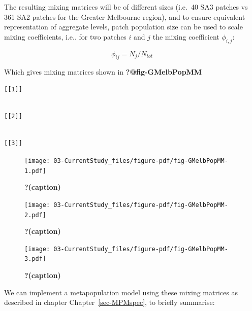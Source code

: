 \documentclass[
  letterpaper,
  DIV=11,
  numbers=noendperiod]{scrreprt}
\begin{document}
The resulting mixing matrices will be of different sizes (i.e.~40 SA3
patches vs 361 SA2 patches for the Greater Melbourne region), and to
ensure equivalent representation of aggregate levels, patch population
size can be used to scale mixing coefficients, i.e.. for two patches
\(i\) and \(j\) the mixing coefficient \(\phi_{i,j}\):

\[
\phi_{ij} = N_j/N_{tot}
\]

Which gives mixing matrices shown in \textbf{?@fig-GMelbPopMM}

\begin{verbatim}
[[1]]
\end{verbatim}

\begin{verbatim}

[[2]]
\end{verbatim}

\begin{verbatim}

[[3]]
\end{verbatim}

\begin{figure}

{\centering \texttt{[image: 03-CurrentStudy\_files/figure-pdf/fig-GMelbPopMM-1.pdf]}

}

\caption{\label{fig-GMelbPopMM-1}\textbf{?(caption)}}

\end{figure}

\begin{figure}

{\centering \texttt{[image: 03-CurrentStudy\_files/figure-pdf/fig-GMelbPopMM-2.pdf]}

}

\caption{\label{fig-GMelbPopMM-2}\textbf{?(caption)}}

\end{figure}

\begin{figure}

{\centering \texttt{[image: 03-CurrentStudy\_files/figure-pdf/fig-GMelbPopMM-3.pdf]}

}

\caption{\label{fig-GMelbPopMM-3}\textbf{?(caption)}}

\end{figure}

We can implement a metapopulation model using these mixing matrices as
described in chapter Chapter~\ref{sec-MPMspec}, to briefly summarise:
\end{document}
